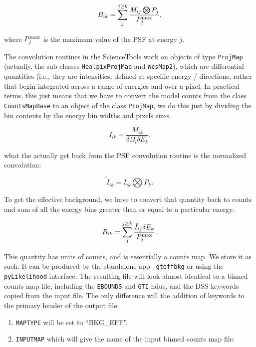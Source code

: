 \documentclass[preprint]{aastex}
\begin{document}
\begin{equation}
B_{ik} = \sum_{j}^{j \ge k} \frac{M_{ij} \bigotimes P_{j}}{P_{j}^{\rm max}}, 
\end{equation}

\noindent where $P_{j}^{\rm max}$ is the maximum value of the PSF at energy $j$.

The convolution routines in the ScienceTools work on objects
of type {\tt ProjMap} (actually, the sub-classes {\tt HealpixProjMap}
and {\tt WcsMap2}), which are differential quantities (i.e., they are
intensities, defined at specific energy / directions, rather that
begin integrated across a range of energies and over a pixel.  In
practical terms, this just means that we have to convert the model
counts from the class {\tt CountsMapBase} to an object of the class
{\tt ProjMap}, we do this just by dividing the bin contents by the
energy bin widths and pixels sizes.

\begin{equation}
I_{ik} = \frac{M_{ik}}{\delta \Omega_i \delta E_k}.
\end{equation}

\noindent what the actually get back from the PSF convolution routine
is the normalized convolution:

\begin{equation}
\tilde{I}_{ik} = I_{ik} \bigotimes P_{k}.
\end{equation}

To get the effective background, we have to convert that quantity back
to counts and sum of all the energy bins greater than or equal to a particular
energy.

\begin{equation}
B_{ik} = \sum_{j}^{j \ge k} \frac{\tilde{I}_{ij} \delta E_k}{P_{j}^{\rm max}}.
\end{equation}

This quantity has units of counts, and is essentially a counts map.
We store it as such.  It can be produced by the standalone app {\tt
  gteffbkg} or using the {\tt pyLikelihood} interface.  The resulting
file will look almost identical to a binned counts map file, including
the {\tt EBOUNDS} and {\tt GTI} hdus, and the DSS keywords copied from
the input file.  The only difference will the addition of keywords to 
the primary header of the output file:

\begin{enumerate}
\item{{\tt MAPTYPE} will be set to ``BKG_EFF''.}
\item{{\tt INPUTMAP} which will give the name of the input binned counts map
file.}
\end{enumerate}
\end{document}
